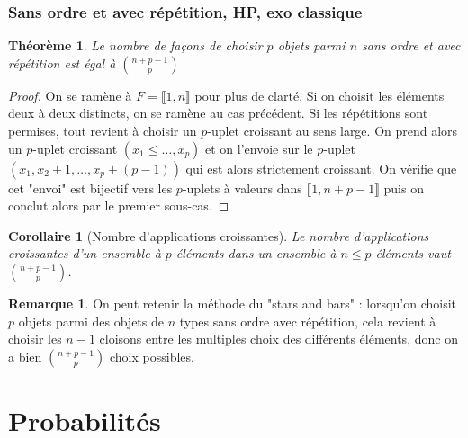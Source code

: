 \documentclass[french]{book}
\theoremstyle{plain}
\newtheorem{thm}{Théorème}[chapter]
\newtheorem{cor}{Corollaire}[chapter]
\theoremstyle{definition}
\newtheorem{rmq}{Remarque}[chapter]
\theoremstyle{remark}
\begin{document}
\subsection{Sans ordre et avec répétition, HP, exo classique}
\begin{thm}
	Le nombre de façons de choisir $p$ objets parmi $n$ sans ordre et avec répétition est égal à $\displaystyle \binom{n+p-1}{p}$
\end{thm}
\begin{proof}
	 On se ramène à $F=\llbracket1,n\rrbracket$ pour plus de clarté. Si on choisit les éléments deux à deux distincts, on se ramène au cas précédent. Si les répétitions sont permises, tout revient à choisir un $p$-uplet croissant au sens large. On prend alors un $p$-uplet croissant $(x_1\leqslant\ldots,x_p)$ et on l'envoie sur le $p$-uplet $(x_1,x_2+1,\ldots,x_p+(p-1))$ qui est alors strictement croissant. On vérifie que cet "envoi" est bijectif vers les $p$-uplets à valeurs dans $\llbracket1,n+p-1\rrbracket$ puis on conclut alors par le premier sous-cas.
\end{proof}
\begin{cor}[Nombre d'applications croissantes]
	Le nombre d'applications croissantes d'un ensemble à $p$ éléments dans un ensemble à $n\leqslant p$ éléments vaut $\displaystyle \binom{n+p-1}{p}$.
\end{cor}
\begin{rmq} On peut retenir la méthode du "stars and bars" : lorsqu'on choisit $p$ objets parmi des objets de $n$ types sans ordre avec répétition, cela revient à choisir les $n-1$ cloisons entre les multiples choix des différents éléments, donc on a bien $\displaystyle \binom{n+p-1}{p}$ choix possibles. \end{rmq}

\newpage
\chapter{Probabilités}
\end{document}
